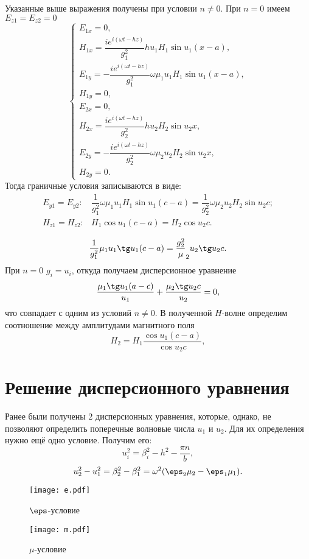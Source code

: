\documentclass[12pt]{hedsemwork}
\renewcommand{\frac}{\dfrac}
\begin{document}
Указанные выше выражения получены при условии \( n \neq 0 \). При \( n = 0 \)
имеем \( E_{z1} = E_{z2} = 0 \)
\[
    \left\{
    \begin{array}{l}
        E_{1x} = 0, \\
        H_{1x} = \frac{i e^{i(\omega t - h z)}}{g_1^2}
        h u_1 H_1 \sin u_1 (x-a),\\
        E_{1y} = -\frac{i e^{i(\omega t - h z)}}{g_1^2}
        \omega\mu_1u_1H_1 \sin u_1 (x-a),\\
        H_{1y} = 0,\\
        E_{2x} = 0,\\
        H_{2x} = \frac{i e^{i(\omega t - h z)}}{g_2^2}
        h u_2 H_2 \sin u_2 x,\\
        E_{2y} = -\frac{i e^{i(\omega t - h z)}}{g_2^2}
        \omega\mu_2u_2H_2 \sin u_2 x,\\
        H_{2y} = 0.
    \end{array}
    \right.
\]
Тогда граничные условия записываются в виде:
\[
\begin{array}{cl}
    E_{y1} = E_{y2}: &
    \frac{1}{g_1^2}  \omega\mu_1u_1H_1 \sin u_1 (c-a) =
    \frac{1}{g_2^2}  \omega\mu_2u_2H_2 \sin u_2 c ;\\
    H_{z1} = H_{z2}: & H_1\cos u_1 (c-a) = H_2\cos u_2 c.\\
\end{array}
\]
\[
    \frac{1}{g_1^2} \mu_1 u_1 \tg u_1 (c-a) = \frac{g_2^2} \mu_2 u_2 \tg u_2 c.
\]
При \( n=0 \) \( g_i = u_i \), откуда получаем дисперсионное уравнение
\[
    \frac{\mu_1\tg u_1 (a-c)}{u_1} + \frac{\mu_2\tg u_2 c}{u_2} = 0,
\]
что совпадает с одним из условий \( n \neq 0 \).
В полученной \( H \)-волне определим соотношение между амплитудами магнитного
поля
\[
    H_2 = H_1\frac{\cos u_1 (c-a)}{\cos u_2 c},
\]

\section{Решение дисперсионного уравнения}
Ранее были получены 2 дисперсионных уравнения, которые, однако, не позволяют
определить поперечные волновые числа \( u_1 \) и \( u_2 \). Для их определения
нужно ещё одно условие. Получим его:
\[
    u_i^2 = \beta_i^2 - h^2 - \frac{\pi n}{b},
\]
\[
    u_2^2 - u_1^2 = \beta_2^2 - \beta_1^2 = \omega^2(\eps_2\mu_2 - \eps_1\mu_1).
\]
\begin{figure}
    \texttt{[image: e.pdf]}
    \caption{\( \eps \)-условие}
\end{figure}
\begin{figure}
    \texttt{[image: m.pdf]}
    \caption{\( \mu \)-условие}
\end{figure}
\end{document}
